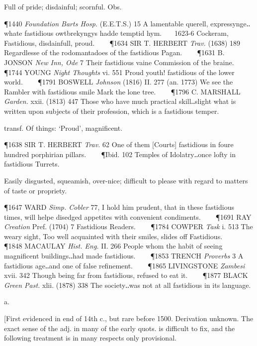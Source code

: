 \begin{description}[wide, labelwidth=!, labelindent=0pt]
\begin{myenumerate}
 Full of pride; disdainful; scornful. Obs.

\P 1440 \textit{Foundation  Barts Hosp.} (E.E.T.S.) 15 A lamentable querell, expressynge‥whate fastidious owtbrekyngys hadde temptid hym.    1623-6 Cockeram, Fastidious, disdainfull, proud.    
\P 1634 SIR T. HERBERT  \textit{Trav.} (1638) 189 Regardlesse of the rodomantadoes of the fastidious Pagan.    
\P 1631 B. JONSON  \textit{New Inn, Ode} 7 Their fastidious vaine Commission of the braine.    
\P 1744 YOUNG  \textit{Night Thoughts} vi. 551 Proud youth! fastidious of the lower world.    
\P 1791 BOSWELL  \textit{Johnson} (1816) II. 277 (an. 1773) We see the Rambler with fastidious smile Mark the lone tree.    
\P 1796 C. MARSHALL  \textit{Garden.} xxii. (1813) 447 Those who have much practical skill‥slight what is written upon subjects of their profession, which is a fastidious temper.

 transf. Of things: ‘Proud’, magnificent.

\P 1638 SIR T. HERBERT  \textit{Trav.} 62 One of them [Courts] fastidious in foure hundred porphirian pillars.    
\P Ibid. 102 Temples of Idolatry‥once lofty in fastidious Turrets.

 Easily disgusted, squeamish, over-nice; difficult to please with regard to matters of taste or propriety.

\P 1647 WARD  \textit{Simp. Cobler} 77, I hold him prudent, that in these fastidious times, will helpe disedged appetites with convenient condiments.    
\P 1691 RAY  \textit{Creation} Pref. (1704) 7 Fastidious Readers.    
\P 1784 COWPER  \textit{Task} i. 513 The weary sight, Too well acquainted with their smiles, slides off Fastidious.    
\P 1848 MACAULAY  \textit{Hist. Eng.} II. 266 People whom the habit of seeing magnificent buildings‥had made fastidious.    
\P 1853 TRENCH  \textit{Proverbs} 3 A fastidious age‥and one of false refinement.    
\P 1865 LIVINGSTONE  \textit{Zambesi} xvii. 342 Though being far from fastidious, refused to eat it.    
\P 1877 BLACK  \textit{Green Past.} xlii. (1878) 338 The society‥was not at all fastidious in its language.
\end{myenumerate}


 a.

\noindent {}

\noindent [First evidenced in end of 14th c., but rare before 1500. Derivation unknown. The exact sense of the adj. in many of the early quots. is difficult to fix, and the following treatment is in many respects only provisional.


\end{description}
